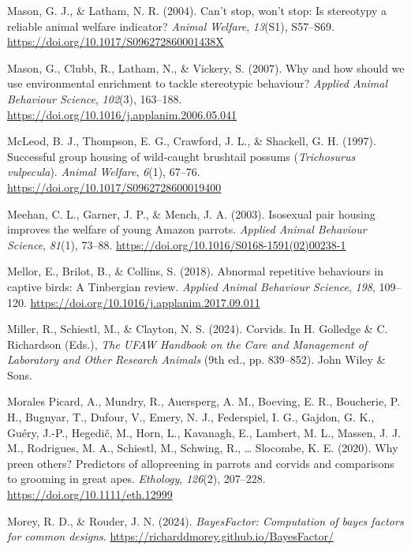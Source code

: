 \documentclass[
  pub]{apa6}
\newlength{\cslhangindent}
\newenvironment{CSLReferences}[2] %
 {\begin{list}{}{%
  \setlength{\itemindent}{0pt}
  \setlength{\leftmargin}{0pt}
  \setlength{\parsep}{0pt}
  \ifodd #1
   \setlength{\leftmargin}{\cslhangindent}
   \setlength{\itemindent}{-1\cslhangindent}
  \fi
  \setlength{\itemsep}{#2\baselineskip}}}
 {\end{list}}
\begin{document}
\begin{CSLReferences}{1}{0}
Mason, G. J., \& Latham, N. R. (2004). Can't stop, won't stop: Is stereotypy a reliable animal welfare indicator? \emph{Animal Welfare}, \emph{13}(S1), S57--S69. \url{https://doi.org/10.1017/S096272860001438X}

Mason, G., Clubb, R., Latham, N., \& Vickery, S. (2007). Why and how should we use environmental enrichment to tackle stereotypic behaviour? \emph{Applied Animal Behaviour Science}, \emph{102}(3), 163--188. \url{https://doi.org/10.1016/j.applanim.2006.05.041}

McLeod, B. J., Thompson, E. G., Crawford, J. L., \& Shackell, G. H. (1997). Successful group housing of wild-caught brushtail possums ({\emph{Trichosurus}}{ \emph{vulpecula}}). \emph{Animal Welfare}, \emph{6}(1), 67--76. \url{https://doi.org/10.1017/S0962728600019400}

Meehan, C. L., Garner, J. P., \& Mench, J. A. (2003). Isosexual pair housing improves the welfare of young {Amazon} parrots. \emph{Applied Animal Behaviour Science}, \emph{81}(1), 73--88. \url{https://doi.org/10.1016/S0168-1591(02)00238-1}

Mellor, E., Brilot, B., \& Collins, S. (2018). Abnormal repetitive behaviours in captive birds: A {Tinbergian} review. \emph{Applied Animal Behaviour Science}, \emph{198}, 109--120. \url{https://doi.org/10.1016/j.applanim.2017.09.011}

Miller, R., Schiestl, M., \& Clayton, N. S. (2024). Corvids. In H. Golledge \& C. Richardson (Eds.), \emph{The {UFAW Handbook} on the {Care} and {Management} of {Laboratory} and {Other Research Animals}} (9th ed., pp. 839--852). John Wiley \& Sons.

Morales Picard, A., Mundry, R., Auersperg, A. M., Boeving, E. R., Boucherie, P. H., Bugnyar, T., Dufour, V., Emery, N. J., Federspiel, I. G., Gajdon, G. K., Guéry, J.-P., Hegedič, M., Horn, L., Kavanagh, E., Lambert, M. L., Massen, J. J. M., Rodrigues, M. A., Schiestl, M., Schwing, R., \ldots{} Slocombe, K. E. (2020). Why preen others? {Predictors} of allopreening in parrots and corvids and comparisons to grooming in great apes. \emph{Ethology}, \emph{126}(2), 207--228. \url{https://doi.org/10.1111/eth.12999}

Morey, R. D., \& Rouder, J. N. (2024). \emph{BayesFactor: Computation of bayes factors for common designs}. \url{https://richarddmorey.github.io/BayesFactor/}


\end{CSLReferences}
\end{document}
